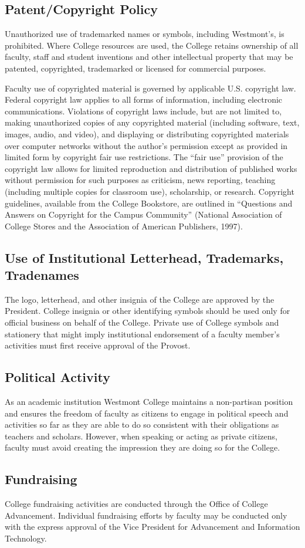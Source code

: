 	\subsection{Patent/Copyright Policy}

		Unauthorized use of trademarked names or symbols, including Westmont's, is
		prohibited.  Where College resources are used, the College retains ownership
		of all faculty, staff and student inventions and other intellectual property
		that may be patented, copyrighted, trademarked or licensed for commercial
		purposes.

		Faculty use of copyrighted material is governed by applicable U.S.
		copyright law.  Federal copyright law applies to all forms of
		information, including electronic communications.  Violations of
		copyright laws include, but are not limited to, making unauthorized
		copies of any copyrighted material (including software, text, images,
		audio, and video), and displaying or distributing copyrighted materials
		over computer networks without the author's permission except as
		provided in limited form by copyright fair use restrictions.  The ``fair
		use'' provision of the copyright law allows for limited reproduction and
		distribution of published works without permission for such purposes as
		criticism, news reporting, teaching (including multiple copies for
		classroom use), scholarship, or research.  Copyright guidelines,
		available from the College Bookstore, are outlined in ``Questions and
		Answers on Copyright for the Campus Community'' (National Association of
		College Stores and the Association of American Publishers, 1997).

	\subsection{Use of Institutional Letterhead, Trademarks, Tradenames}
		The logo, letterhead, and other insignia of the College are approved by the President.  College insignia or other identifying symbols should be used only for official business on behalf of the College.  Private use of College symbols and stationery that might imply institutional endorsement of a faculty member's activities must first receive approval of the Provost.
	\subsection{Political Activity}
		As an academic institution Westmont College maintains a non-partisan position and ensures the freedom of faculty as citizens to engage in political speech and activities so far as they are able to do so consistent with their obligations as teachers and scholars.  However, when speaking or acting as private citizens, faculty must avoid creating the impression they are doing so for the College.
	\subsection{Fundraising}
		College fundraising activities are conducted through the Office of College Advancement.  Individual fundraising efforts by faculty may be conducted only with the express approval of the Vice President for Advancement and Information Technology.
